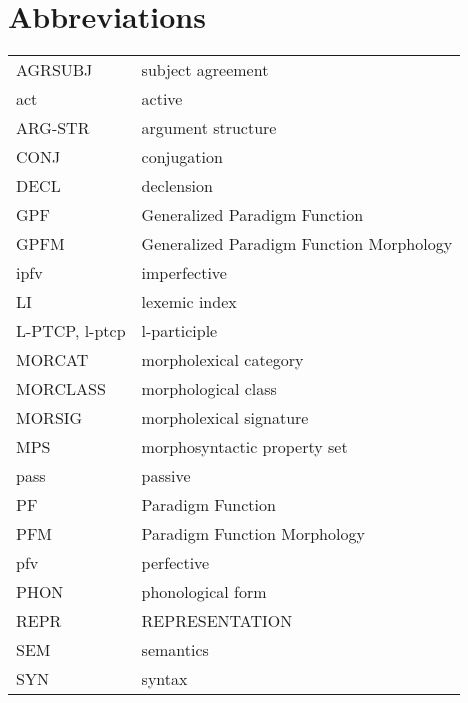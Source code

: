 \documentclass[output=paper,
modfonts
]{LSP/langsci}
\begin{document}
\section*{Abbreviations}
\begin{tabular}{ll}

AGRSUBJ	&subject agreement					\\

act	&active									\\

ARG-STR	&argument structure					\\

CONJ	&conjugation							\\

DECL	&declension							\\

GPF	&Generalized Paradigm Function				\\

GPFM	&Generalized Paradigm Function Morphology\\

ipfv	&imperfective								\\

LI	&lexemic index							\\

L-PTCP, l-ptcp	&l-participle						\\

MORCAT & morpholexical category \\

MORCLASS &morphological class					\\

MORSIG &morpholexical signature				\\

MPS	&morphosyntactic property set				\\

pass	&passive									\\

PF	&Paradigm Function						\\

PFM	&Paradigm Function Morphology				\\

pfv	&perfective								\\

PHON	&phonological form					\\

REPR &REPRESENTATION						\\

SEM	&semantics								\\

SYN	&syntax									\\
\end{tabular}
\end{document}
